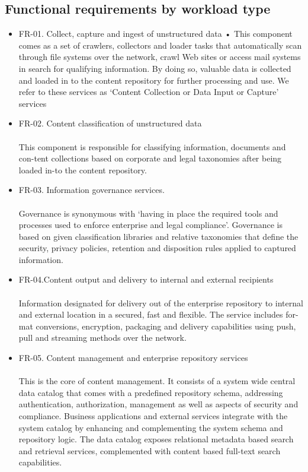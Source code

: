 \documentclass[EPiC]{easychair} %
\begin{document}
\subsection{ Functional requirements by workload type} 
\begin{itemize}
    \item FR-01. Collect, capture and ingest of unstructured data
    •	This component comes as a set of crawlers, collectors and loader tasks that automatically scan through file systems over the network, crawl Web sites or access mail systems in search for qualifying information. By doing so, valuable data is collected and loaded in to the content repository for further processing and use. We refer to these services as ‘Content Collection or Data Input or Capture’ services
    \item FR-02. Content classification of unstructured data \paragraph{} This component is responsible for classifying information, documents and con-tent collections based on corporate and legal taxonomies after being loaded in-to the content repository.
    \item FR-03. Information governance services. \paragraph{} Governance is synonymous with ‘having in place the required tools and processes used to enforce enterprise and legal compliance’. Governance is based on given classification libraries and relative taxonomies that define the security, privacy policies, retention and disposition rules applied to captured information.
    \item FR-04.Content output and delivery to internal and external recipients \paragraph{} Information designated for delivery out of the enterprise repository to internal and external location in a secured, fast and flexible. The service includes for-mat conversions, encryption, packaging and delivery capabilities using push, pull and streaming methods over the network. 
    \item FR-05. Content management and enterprise repository services \paragraph{} This is the core of content management. It consists of a system wide central data catalog that comes with a predefined repository schema, addressing authentication, authorization, management as well as aspects of security and compliance. Business applications and external services integrate with the system catalog by enhancing and complementing the system schema and repository logic. The data catalog exposes relational metadata based search and retrieval services, complemented with content based full-text search capabilities. 

\end{itemize}
\end{document}
